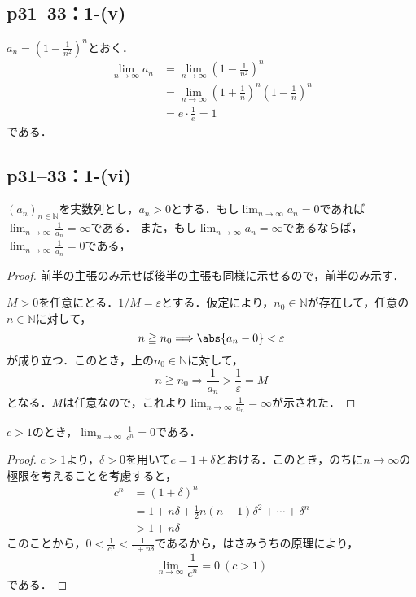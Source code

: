 \documentclass[a4paper,10pt,fleqn]{ltjsarticle}
\begin{document}
\subsection*{p31--33：1-(v)}
\begin{tleftbar}
    $a_n =\left (1-\frac{1}{n^2}\right)^n$とおく．
    \begin{align*}
        \lim_{n \to \infty} a_n & =\lim_{n \to \infty} \left (1-\frac{1}{n^2}\right)^n                              \\
                                & = \lim_{n \to \infty} \left (1+\frac{1}{n}\right)^n \left (1-\frac{1}{n}\right)^n \\
                                & = e \cdot \frac{1}{e} =1
    \end{align*}
    である．
\end{tleftbar}

\subsection*{p31--33：1-(vi)}


$(a_n)_{n \in \mathbb{N}}$を実数列とし，$a_n > 0$とする．もし$\lim_{n \to \infty} a_n =0$であれば$\lim_{n \to \infty} \frac{1}{a_n}=\infty$である．
また，もし$\lim_{n \to \infty} a_n =\infty$であるならば，$\lim_{n \to \infty} \frac{1}{a_n} =0$である，



\begin{proof}
    前半の主張のみ示せば後半の主張も同様に示せるので，前半のみ示す．

    $M>0$を任意にとる．$1/M = \varepsilon$とする．仮定により，$n_0 \in \mathbb{N}$が存在して，任意の$n \in \mathbb{N}$に対して，
    \[
        n \geqq n_0 \Longrightarrow \abs{a_n-0}<\varepsilon
    \]
    が成り立つ．このとき，上の$n_0 \in \mathbb{N}$に対して，
    \[
        n \geqq n_0 \Longrightarrow \frac{1}{a_n} >\frac{1}{\varepsilon}=M
    \]
    となる．$M$は任意なので，これより$\lim_{n \to \infty} \frac{1}{a_n}=\infty$が示された．
\end{proof}



$c>1$のとき，$\lim_{n \to \infty} \frac{1}{c^n} = 0$である．

\begin{proof}
    $c>1$より，$\delta >0$を用いて$c=1+\delta$とおける．このとき，のちに$n \to \infty$の極限を考えることを考慮すると，
    \begin{align*}
        c^n & = (1+\delta)^n                                               \\
            & = 1+n \delta +\frac{1}{2}n (n-1) \delta^2 + \cdots +\delta^n \\
            & > 1+n \delta
    \end{align*}
    このことから，$0<\frac{1}{c^n} <\frac{1}{1+n\delta}$であるから，はさみうちの原理により，
    \[
        \lim_{n \to \infty} \frac{1}{c^n} = 0~(c>1)
    \]
    である．
\end{proof}
\end{document}
